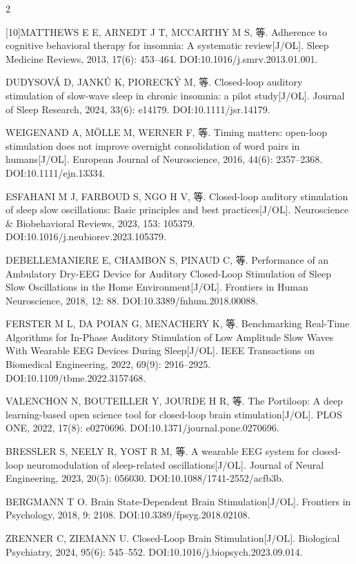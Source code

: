 \documentclass[UTF8,zihao=5,fontset=none]{ctexart}
\begin{document}
\begin{multicols}{2}
{[10]\quad MATTHEWS E E, ARNEDT J T, MCCARTHY M S, 等. Adherence to cognitive behavioral therapy for insomnia: A systematic review[J/OL]. Sleep Medicine Reviews, 2013, 17(6): 453--464. DOI:10.1016/j.smrv.2013.01.001.\par
[11]\quad DUDYSOVÁ D, JANKŮ K, PIORECKÝ M, 等. Closed-loop auditory stimulation of slow-wave sleep in chronic insomnia: a pilot study[J/OL]. Journal of Sleep Research, 2024, 33(6): e14179. DOI:10.1111/jsr.14179.\par
[12]\quad WEIGENAND A, MÖLLE M, WERNER F, 等. Timing matters: open-loop stimulation does not improve overnight consolidation of word pairs in humans[J/OL]. European Journal of Neuroscience, 2016, 44(6): 2357--2368. DOI:10.1111/ejn.13334.\par
[13]\quad ESFAHANI M J, FARBOUD S, NGO H V, 等. Closed-loop auditory stimulation of sleep slow oscillations: Basic principles and best practices[J/OL]. Neuroscience \& Biobehavioral Reviews, 2023, 153: 105379. DOI:10.1016/j.neubiorev.2023.105379.\par
[14]\quad DEBELLEMANIERE E, CHAMBON S, PINAUD C, 等. Performance of an Ambulatory Dry-EEG Device for Auditory Closed-Loop Stimulation of Sleep Slow Oscillations in the Home Environment[J/OL]. Frontiers in Human Neuroscience, 2018, 12: 88. DOI:10.3389/fnhum.2018.00088.\par
[15]\quad FERSTER M L, DA POIAN G, MENACHERY K, 等. Benchmarking Real-Time Algorithms for In-Phase Auditory Stimulation of Low Amplitude Slow Waves With Wearable EEG Devices During Sleep[J/OL]. IEEE Transactions on Biomedical Engineering, 2022, 69(9): 2916--2925. DOI:10.1109/tbme.2022.3157468.\par
[16]\quad VALENCHON N, BOUTEILLER Y, JOURDE H R, 等. The Portiloop: A deep learning-based open science tool for closed-loop brain stimulation[J/OL]. PLOS ONE, 2022, 17(8): e0270696. DOI:10.1371/journal.pone.0270696.\par
[17]\quad BRESSLER S, NEELY R, YOST R M, 等. A wearable EEG system for closed-loop neuromodulation of sleep-related oscillations[J/OL]. Journal of Neural Engineering, 2023, 20(5): 056030. DOI:10.1088/1741-2552/acfb3b.\par
[18]\quad BERGMANN T O. Brain State-Dependent Brain Stimulation[J/OL]. Frontiers in Psychology, 2018, 9: 2108. DOI:10.3389/fpsyg.2018.02108.\par
[19]\quad ZRENNER C, ZIEMANN U. Closed-Loop Brain Stimulation[J/OL]. Biological Psychiatry, 2024, 95(6): 545--552. DOI:10.1016/j.biopsych.2023.09.014.\par
}
\end{multicols}
\end{document}

